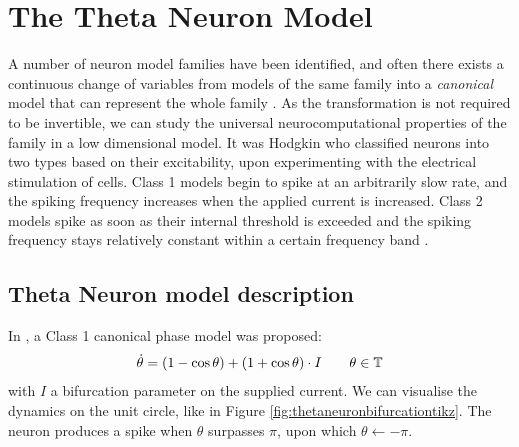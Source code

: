 \newpage
\section{\theory The Theta Neuron Model} \label{TheThetaNeuronModel}
A number of neuron model families have been identified, and often there exists a continuous change of variables from models of the same family into a \textit{canonical} model that can represent the whole family \cite{Hoppensteadt2001CanonicalNM}. As the transformation is not required to be invertible, we can study the universal neurocomputational properties of the family in a low dimensional model.
It was Hodgkin \cite{Hodgkin1948} who classified neurons into two types based on their excitability, upon experimenting with the electrical stimulation of cells. Class 1 models begin to spike at an arbitrarily slow rate, and the spiking frequency increases when the applied current is increased. Class 2 models spike as soon as their internal threshold is exceeded and the spiking frequency stays relatively constant within a certain frequency band \cite{Hoppensteadt2001CanonicalNM}.


\subsection{Theta Neuron model description} \label{sec:TheThetaNeuronModelDescription}
In \cite{Ermentrout1986}, a Class 1 canonical phase model was proposed:
\begin{align}
\dot{\theta} = (1-\cos \theta)+(1+\cos \theta) \cdot I \qquad \theta \in {\mathbb{T}} \label{eq:thetaneuron}
\end{align}
with $I$ a bifurcation parameter on the supplied current. We can visualise the dynamics on the unit circle, like in Figure \ref{fig:thetaneuronbifurcationtikz}. The neuron produces a spike when $\theta$ surpasses $\pi$, upon which $\theta \leftarrow -\pi$. 

